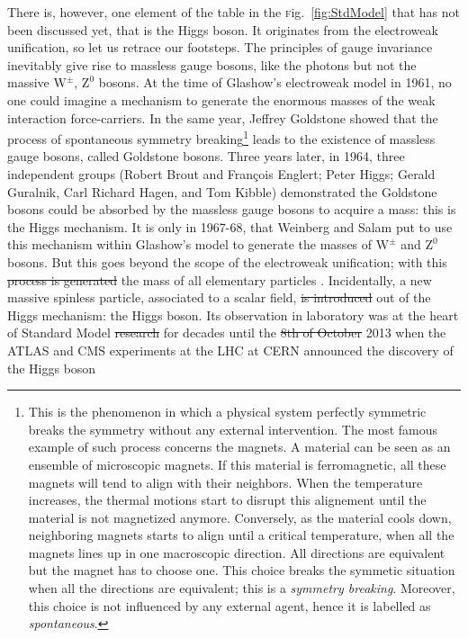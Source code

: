 \documentclass[ALICE,manyauthors]{cernphprep}
\newcommand{\Fig}       {\textsc{f}ig.~}
\newcommand{\fig}       {\Fig}
\newcommand{\rmWplusminus}  {\mbox{$\mathrm {W^{\pm}}$}\xspace}
\newcommand{\rmZzero}       {\mbox{$\mathrm {Z}^{0}$}\xspace}
\providecommand{\DIFaddtex}[1]{{\protect\color{blue}\uwave{#1}}} %
\providecommand{\DIFdeltex}[1]{{\protect\color{red}\sout{#1}}}                      %
\providecommand{\DIFaddbegin}{} %
\providecommand{\DIFaddend}{} %
\providecommand{\DIFdelbegin}{} %
\providecommand{\DIFdelend}{} %
\providecommand{\DIFadd}[1]{\texorpdfstring{\DIFaddtex{#1}}{#1}} %
\providecommand{\DIFdel}[1]{\texorpdfstring{\DIFdeltex{#1}}{}} %
\newcommand{\DIFscaledelfig}{0.5}
\newlength{\DIFdelgraphicswidth} %
\newlength{\DIFdelgraphicsheight} %
\newcommand{\DIFaddincludegraphics}[2][]{{\color{blue}\fbox{\DIFOincludegraphics[#1]{#2}}}} %
\newcommand{\DIFdelincludegraphics}[2][]{%
\sbox{\DIFdelgraphicsbox}{\DIFOincludegraphics[#1]{#2}}%
\settoboxwidth{\DIFdelgraphicswidth}{\DIFdelgraphicsbox} %
\settoboxtotalheight{\DIFdelgraphicsheight}{\DIFdelgraphicsbox} %
\scalebox{\DIFscaledelfig}{%
\parbox[b]{\DIFdelgraphicswidth}{\usebox{\DIFdelgraphicsbox}\\[-\baselineskip] \rule{\DIFdelgraphicswidth}{0em}}\llap{\resizebox{\DIFdelgraphicswidth}{\DIFdelgraphicsheight}{%
\setlength{\unitlength}{\DIFdelgraphicswidth}%
\begin{picture}(1,1)%
\thicklines\linethickness{2pt} %
{\color[rgb]{1,0,0}\put(0,0){\framebox(1,1){}}}%
{\color[rgb]{1,0,0}\put(0,0){\line( 1,1){1}}}%
{\color[rgb]{1,0,0}\put(0,1){\line(1,-1){1}}}%
\end{picture}%
}\hspace*{3pt}}} %
} %
\DeclareRobustCommand{\DIFaddbegin}{\DIFOaddbegin \let\includegraphics\DIFaddincludegraphics} %
\DeclareRobustCommand{\DIFaddend}{\DIFOaddend \let\includegraphics\DIFOincludegraphics} %
\DeclareRobustCommand{\DIFdelbegin}{\DIFOdelbegin \let\includegraphics\DIFdelincludegraphics} %
\DeclareRobustCommand{\DIFdelend}{\DIFOaddend \let\includegraphics\DIFOincludegraphics} %
\begin{document}
There is, however, one element of the table in the \fig\ref{fig:StdModel} that has not been discussed yet, that is the Higgs boson. It originates from the electroweak unification, so let us retrace our footsteps. The principles of gauge invariance inevitably give rise to massless gauge bosons, like the photons but not the massive \rmWplusminus, \rmZzero bosons. At the time of Glashow's electroweak model in 1961, no one could imagine a mechanism to generate the enormous masses of the weak interaction force-carriers. In the same year, Jeffrey Goldstone showed that the process of spontaneous symmetry breaking\footnote{This is the phenomenon in which a physical system perfectly symmetric breaks the symmetry without any external intervention. The most famous example of such process concerns the magnets. A material can be seen as an ensemble of microscopic magnets. If this material is ferromagnetic, all these magnets will tend to align with their neighbors.  When the temperature increases, the thermal motions start to disrupt this alignement until the material is not magnetized anymore. Conversely, as the material cools down, neighboring magnets starts to align until a critical temperature, when all the magnets lines up in one macroscopic direction. All directions are equivalent but the magnet has to choose one. This choice breaks the symmetic situation when all the directions are equivalent; this is a \textit{symmetry breaking}. Moreover, this choice is not influenced by any external agent, hence it is labelled as \textit{spontaneous}.\label{footnote:SpontaneousSymmetryBreaking}} leads to the existence of massless gauge bosons, called Goldstone bosons. Three years later, in 1964, three independent groups (Robert Brout and François Englert; Peter Higgs; Gerald Guralnik, Carl Richard Hagen, and Tom Kibble) demonstrated the Goldstone bosons could be absorbed by the massless gauge bosons to acquire a mass: this is the Higgs mechanism. It is only in 1967-68, that Weinberg and Salam put to use this mechanism within Glashow's model to generate the masses of \rmWplusminus and \rmZzero bosons. But this goes beyond the scope of the electroweak unification; with this \DIFdelbegin \DIFdel{process is generated }\DIFdelend \DIFaddbegin \DIFadd{mechanism, }\DIFaddend the mass of all elementary particles \DIFaddbegin \DIFadd{can be generated }\DIFaddend \cite{s.glashowInteractionsJourneyMind1990}. Incidentally, a new massive spinless particle, associated to a scalar field, \DIFdelbegin \DIFdel{is introduced }\DIFdelend \DIFaddbegin \DIFadd{emerges }\DIFaddend out of the Higgs mechanism: the Higgs boson. Its observation in laboratory was at the heart of Standard Model \DIFdelbegin \DIFdel{research }\DIFdelend \DIFaddbegin \DIFadd{researches }\DIFaddend for decades until the \DIFdelbegin \DIFdel{8th of October }\DIFdelend \DIFaddbegin \DIFadd{14th of March }\DIFaddend 2013 when the ATLAS and CMS experiments at the LHC at CERN announced the discovery of the Higgs boson \DIFaddbegin \DIFadd{\mbox{%
}}
\end{document}
